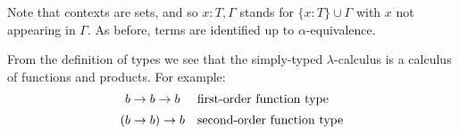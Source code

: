 \documentclass[12pt]{article}
\begin{document}
\begin{center}
\renewcommand{\arraystretch}{.5}
\label{t:SimTyp}
\end{center}%
%
Note that contexts are sets, and so $x : T,\Gamma$ stands for $\{x:T\}\cup\Gamma$ with $x$ not appearing in $\Gamma$. As before, terms are identified up to $\alpha$-equivalence.

From the definition of types we see that the simply-typed $\lambda$-calculus is a calculus of functions and products.
For example:
\[\begin{array}{c@{\quad}l}
 b \rightarrow b \rightarrow b & \mbox{first-order function type} \\[5pt]
(b \rightarrow b ) \rightarrow b & \mbox{second-order function type}
\end{array}\]

\end{document}
